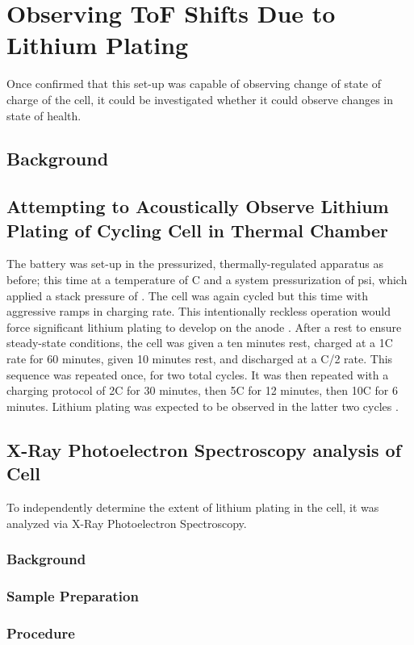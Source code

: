 \section{Observing ToF Shifts Due to Lithium Plating} 
Once confirmed that this set-up was capable of observing change of state of charge of the cell, it could be investigated whether it could observe changes in state of health.

\subsection{Background}

\subsection{Attempting to Acoustically Observe Lithium Plating of Cycling Cell in Thermal Chamber}
The battery was set-up in the pressurized, thermally-regulated apparatus as before; this time at a temperature of  C and a system pressurization of  psi, which applied a stack pressure of . The cell was again cycled but this time with aggressive ramps in charging rate. This intentionally reckless operation would force significant lithium plating to develop on the anode . After a rest to ensure steady-state conditions, the cell was given a ten minutes rest, charged at a 1C rate for 60 minutes, given 10 minutes rest, and discharged at a C/2 rate. This sequence was repeated once, for two total cycles. It was then repeated with a charging protocol of 2C for 30 minutes, then 5C for 12 minutes, then 10C for 6 minutes. Lithium plating was expected to be observed in the latter two cycles .
    
\subsection{X-Ray Photoelectron Spectroscopy analysis of Cell}
    To independently determine the extent of lithium plating in the cell, it was analyzed via X-Ray Photoelectron Spectroscopy.
\subsubsection{Background}

\subsubsection{Sample Preparation}

\subsubsection{Procedure}